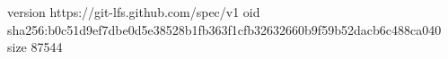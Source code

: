 version https://git-lfs.github.com/spec/v1
oid sha256:b0c51d9ef7dbe0d5e38528b1fb363f1cfb32632660b9f59b52dacb6c488ca040
size 87544
